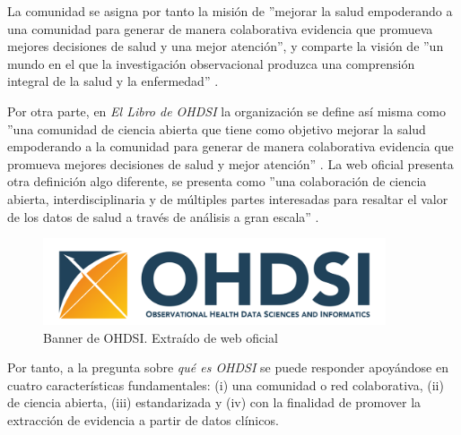 La comunidad se asigna por tanto la misión de ''mejorar la salud empoderando a una comunidad para generar de manera colaborativa evidencia que promueva mejores decisiones de salud y una mejor atención'', y comparte la visión de ''un mundo en el que la investigación observacional produzca una comprensión integral de la salud y la enfermedad'' \cite{OHDSIwebsite}\cite{OHDSIbook}. 

Por otra parte, en \textit{El Libro de OHDSI} la organización se define así misma como ''una comunidad de ciencia abierta que tiene como objetivo mejorar la salud empoderando a la comunidad para generar de manera colaborativa evidencia que promueva mejores decisiones de salud y mejor atención'' \cite{OHDSIbook}. La web oficial presenta otra definición algo diferente, se presenta como ''una colaboración de ciencia abierta, interdisciplinaria y de múltiples partes interesadas para resaltar el valor de los datos de salud a través de análisis a gran escala'' \cite{OHDSIwebsite}.

\begin{figure}[H]
    \centering
    \includegraphics[width=0.90\textwidth]{figures/OHDSIbanner.png}
    \caption{Banner de OHDSI. Extraído de web oficial \cite{OHDSIwebsite}}
    \label{fig:OHDSIbanner}
\end{figure}

Por tanto, a la pregunta sobre \textit{qué es OHDSI} se puede responder apoyándose en cuatro características fundamentales: (i)  una comunidad o red colaborativa, (ii) de ciencia abierta, (iii) estandarizada y (iv) con la finalidad de promover la extracción de evidencia a partir de datos clínicos.

